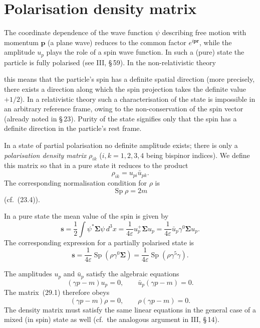 \section{Polarisation density matrix}

The coordinate dependence of the wave function $\psi$ describing free motion with momentum $\mathbf{p}$ (a plane wave) reduces to the common factor $e^{i\mathbf{p}\mathbf{r}}$, while the amplitude $u_p$ plays the role of a spin wave function. In such a (pure) state the particle is fully polarised (see III, \S\,59). In the non-relativistic theory

this means that the particle's spin has a definite spatial direction (more precisely, there exists a direction along which the spin projection takes the definite value $+1/2$). In a relativistic theory such a characterisation of the state is impossible in an arbitrary reference frame, owing to the non-conservation of the spin vector (already noted in \S\,23). Purity of the state signifies only that the spin has a definite direction in the particle's rest frame.

In a state of partial polarisation no definite amplitude exists; there is only a \emph{polarisation density matrix} $\rho_{ik}$ ($i, k = 1, 2, 3, 4$ being bispinor indices). We define this matrix so that in a pure state it reduces to the product
\begin{equation}
\rho_{ik} = u_{pi}\bar u_{pk}.
\tag{29.1}
\end{equation}
The corresponding normalisation condition for $\rho$ is
\begin{equation}
\operatorname{Sp}\rho = 2m
\tag{29.2}
\end{equation}
(cf.~(23.4)).

In a pure state the mean value of the spin is given by
\begin{equation}
\mathbf{s} = \frac{1}{2}\int\psi^*\boldsymbol{\Sigma}\psi\,d^3x = \frac{1}{4\varepsilon}u^+_p\boldsymbol{\Sigma}u_p = \frac{1}{4\varepsilon}\bar u_p\gamma^0\boldsymbol{\Sigma}u_p.
\tag{29.3}
\end{equation}
The corresponding expression for a partially polarised state is
\begin{equation}
\mathbf{s} = \frac{1}{4\varepsilon}\operatorname{Sp}(\rho\gamma^0\boldsymbol{\Sigma}) = \frac{1}{4\varepsilon}\operatorname{Sp}(\rho\gamma^5\gamma).
\tag{29.4}
\end{equation}

The amplitudes $u_p$ and $\bar u_p$ satisfy the algebraic equations
\[
(\gamma p - m)u_p = 0,\qquad \bar u_p(\gamma p - m) = 0.
\]
The matrix~(29.1) therefore obeys
\begin{equation}
(\gamma p - m)\rho = 0,\qquad \rho(\gamma p - m) = 0.
\tag{29.5}
\end{equation}
The density matrix must satisfy the same linear equations in the general case of a mixed (in spin) state as well (cf.\ the analogous argument in III, \S\,14).

